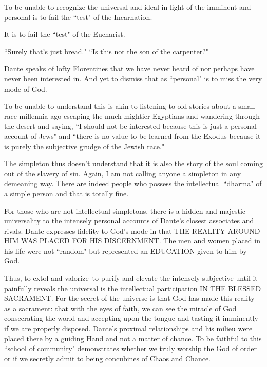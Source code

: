 \begin{footnotesize}
\begin{sffamily}
To be unable to recognize the universal and ideal in light of the imminent and personal is to fail the ``test" of the Incarnation.

It is to fail the ``test" of the Eucharist.

``Surely that's just bread." ``Is this not the son of the carpenter?"

Dante speaks of lofty Florentines that we have never heard of nor perhaps have never been interested in. And yet to dismiss that as ``personal" is to miss the very mode of God.

To be unable to understand this is akin to listening to old stories about a small race millennia ago escaping the much mightier Egyptians and wandering through the desert and saying, ``I should not be interested because this is just a personal account of Jews" and ``there is no value to be learned from the Exodus because it is purely the subjective grudge of the Jewish race."

The simpleton thus doesn't understand that it is also the story of the soul coming out of the slavery of sin. Again, I am not calling anyone a simpleton in any demeaning way. There are indeed people who possess the intellectual ``dharma" of a simple person and that is totally fine.

For those who are not intellectual simpletons, there is a hidden and majestic universality to the intensely personal accounts of Dante's closest associates and rivals. Dante expresses fidelity to God's mode in that THE REALITY AROUND HIM WAS PLACED FOR HIS DISCERNMENT. The men and women placed in his life were not ``random" but represented an EDUCATION given to him by God.

Thus, to extol and valorize–to purify and elevate the intensely subjective until it painfully reveals the universal is the intellectual participation IN THE BLESSED SACRAMENT. For the secret of the universe is that God has made this reality as a sacrament: that with the eyes of faith, we can see the miracle of God consecrating the world and accepting upon the tongue and tasting it imminently if we are properly disposed. Dante's proximal relationships and his milieu were placed there by a guiding Hand and not a matter of chance. To be faithful to this ``school of community" demonstrates whether we truly worship the God of order or if we secretly admit to being concubines of Chaos and Chance.


\end{sffamily}\end{footnotesize}
